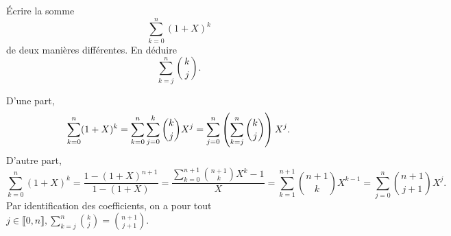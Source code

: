 \documentclass{magnolia}
\begin{document}




Écrire la somme
\[\sum_{k=0}^n (1+X)^k\]
de deux manières différentes. En déduire
\[\sum_{k=j}^n \binom{k}{j}.\]

\begin{sol}
D'une part,
$$\sum_{k=0}^n (1+X)^k=\sum_{k=0}^n \sum_{j=0}^k \binom{k}{j}X^j=\sum_{j=0}^n\left(\sum_{k=j}^n\binom{k}{j}\right)X^j.$$
D'autre part, $$\sum_{k=0}^n (1+X)^k=\frac{1-(1+X)^{n+1}}{1-(1+X)}=\frac{\sum_{k=0}^{n+1}\binom{n+1}{k}X^k -1}{X}=\sum_{k=1}^{n+1}\binom{n+1}{k}X^{k-1}=\sum_{j=0}^{n}\binom{n+1}{j+1}X^{j}.$$
Par identification des coefficients, on a pour tout $j\in \llbracket 0,n\rrbracket, \sum_{k=j}^n \binom{k}{j}=\binom{n+1}{j+1}$.
\end{sol}


\end{document}
